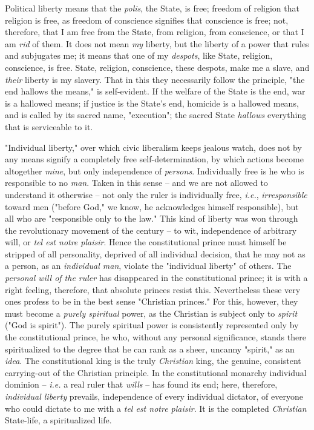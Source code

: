 \documentclass[a4paper]{book}
\begin{document}
Political liberty means that the \textit{polis}, the State, is free; freedom 
of religion that religion is free, as freedom of conscience signifies that 
conscience is free; not, therefore, that I am free from the State, from 
religion, from conscience, or that I am \textit{rid} of them. It does not mean 
\textit{my} liberty, but the liberty of a power that rules and subjugates me; 
it means that one of my \textit{despots}, like State, religion, conscience, is 
free. State, religion, conscience, these despots, make me a slave, and 
\textit{their} liberty is my slavery. That in this they necessarily follow the 
principle, "{}the end hallows the means,"{} is self-evident. If the welfare of 
the State is the end, war is a hallowed means; if justice is the State's end, 
homicide is a hallowed means, and is called by its sacred name, 
"{}execution"{}; the sacred State \textit{hallows} everything that is 
serviceable to it.

"{}Individual liberty,"{} over which civic liberalism keeps jealous watch, 
does not by any means signify a completely free self-determination, by which 
actions become altogether \textit{mine}, but only independence of 
\textit{persons}. Individually free is he who is responsible to no 
\textit{man}. Taken in this sense -- and we are not allowed to understand it 
otherwise -- not only the ruler is individually free, \textit{i.e.}, 
\textit{irresponsible} toward men ("{}before God,"{} we know, he acknowledges 
himself responsible), but all who are "{}responsible only to the law."{} This 
kind of liberty was won through the revolutionary movement of the century -- 
to wit, independence of arbitrary will, or \textit{tel est notre plaisir}. 
Hence the constitutional prince must himself be stripped of all personality, 
deprived of all individual decision, that he may not as a person, as an 
\textit{individual man}, violate the "{}individual liberty"{} of others. The 
\textit{personal will of the ruler} has disappeared in the constitutional 
prince; it is with a right feeling, therefore, that absolute princes resist 
this. Nevertheless these very ones profess to be in the best sense 
"{}Christian princes."{} For this, however, they must become a \textit{purely 
spiritual} power, as the Christian is subject only to \textit{spirit} ("{}God 
is spirit"{}). The purely spiritual power is consistently represented only by 
the constitutional prince, he who, without any personal significance, stands 
there spiritualized to the degree that he can rank as a sheer, uncanny 
"{}spirit,"{} as an \textit{idea}. The constitutional king is the truly 
\textit{Christian} king, the genuine, consistent carrying-out of the Christian 
principle. In the constitutional monarchy individual dominion -- \textit{i.e.} 
a real ruler that \textit{wills} -- has found its end; here, therefore, 
\textit{individual liberty} prevails, independence of every individual 
dictator, of everyone who could dictate to me with a \textit{tel est notre 
plaisir}. It is the completed \textit{Christian} State-life, a spiritualized 
life.
\end{document}
